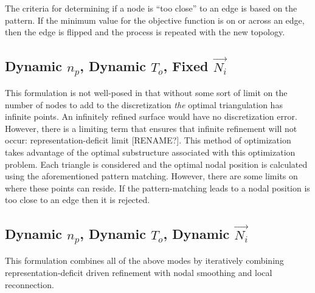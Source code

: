 The criteria for determining if a node is ``too close'' to an edge is
based on the pattern. If the minimum value for the objective function is
on or across an edge, then the edge is flipped and the process is
repeated with the new topology.

\subsection{Dynamic $n_p$, Dynamic $T_o$, Fixed $\vec{N_i}$}
This formulation is not well-posed in that without some sort of limit on
the number of nodes to add to the discretization {\it the} optimal
triangulation has infinite points. An infinitely refined surface would
have no discretization error. However, there is a limiting term that
ensures that infinite refinement will not occur: representation-deficit
limit [RENAME?]. This method of optimization takes advantage of the
optimal substructure associated with this optimization problem. Each
triangle is considered and the optimal nodal position is calculated
using the aforementioned pattern matching. However, there are some
limits on where these points can reside. If the pattern-matching leads
to a nodal position is too close to an edge then it is rejected.

\subsection{Dynamic $n_p$, Dynamic $T_o$, Dynamic $\vec{N_i}$}
This formulation combines all of the above modes by iteratively
combining representation-deficit driven refinement with nodal smoothing
and local reconnection.

